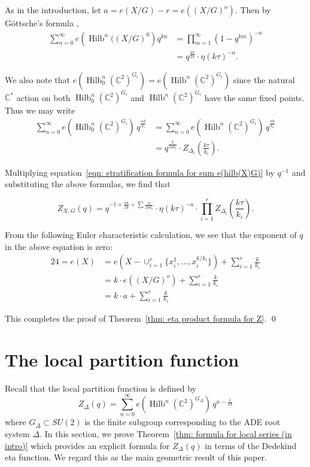 \documentclass{amsart}
\theoremstyle{definition}
\newcommand{\CC} {{\mathbb C}}          %
\newcommand{\Hilb}{\operatorname{Hilb}}
\begin{document}
As in the introduction, let $a = e(X/G)-r=e\left((X/G)^{o}
\right)$. Then by G\"ottsche's formula \cite{gottsche1990betti},
\begin{align*}
\sum_{n=0}^{\infty} e\left(\Hilb^{n}((X/G)^{0} \right) q^{kn} &=
\prod_{m=1}^{\infty} (1-q^{km})^{-a}\\
&= q^{\frac{ak}{24}} \cdot \eta (k\tau )^{-a}. 
\end{align*}

We also note that $e\left(\Hilb_{0}^{n}(\CC^{2})^{G_{i}}
\right)=e\left(\Hilb^{n}(\CC^{2})^{G_{i}} \right)$ since the natural
$\CC^{*}$ action on both $\Hilb_{0}^{n}(\CC^{2})^{G_{i}}$ and
$\Hilb^{n}(\CC^{2})^{G_{i}}$ have the same fixed points. Thus we may
write
\begin{align*}
\sum_{n=0}^{\infty} e\left(\Hilb_{0}^{n}(\CC^{2})^{G_{i}} \right) \,
q^{\frac{nk}{k_{i}}} &= \sum_{n=0}^{\infty} e\left(\Hilb^{n}(\CC^{2})^{G_{i}} \right) \,
q^{\frac{nk}{k_{i}}}\\
&= q^{\frac{k}{24k_{i}}} \cdot Z_{\Delta_{i}} \left(\frac{k\tau}{k_{i}}
\right) .
\end{align*}

Multiplying equation~\eqref{eqn: stratification formula for sum
e(hilb(X)G)} by $q^{-1}$ and substituting the above formulas, we find
that

\[
Z_{X,G}(q) = q^{-1 +\frac{ak}{24} + \sum \frac{k}{24k_{i}} } \cdot 
\eta (k\tau )^{-a}\cdot 
\prod_{i=1}^{r}Z_{\Delta_{i}}\left(\frac{k\tau}{k_{i}} \right) .
\]

From the following Euler characteristic calculation, we see that the exponent of $q$ in the above equation is zero:
\begin{align*}
24 = e(X) &= e\left(X-\cup_{i=1}^{r} \{x_{i}^{1},\dotsc
,x_{i}^{k/k_{i}} \} \right) + \sum_{i=1}^{r} \frac{k}{k_{i}} \\
&= k \cdot e\left((X/G)^{o} \right) + \sum_{i=1}^{r} \frac{k}{k_{i}} \\
&= k\cdot a + \sum_{i=1}^{r}\frac{k}{k_{i}} 
\end{align*}

This completes the proof of Theorem~\ref{thm: eta product formula for
Z}.  \qed


\section{The local partition function}\label{sec: proof of formula for local series}


Recall that the local partition function is defined by
\[
Z_{\Delta} (q) = \sum_{n=0}^{\infty}
e\left(\Hilb^{n}(\CC^{2})^{G_{\Delta}} \right) \, q^{n-\frac{1}{24}} 
\]
where $G_{\Delta}\subset SU(2)$ is the finite subgroup corresponding
to the ADE root system $\Delta$. In this section, we prove
Theorem~\ref{thm: formula for local series (in intro)} which provides
an explicit formula for $Z_{\Delta}(q)$ in terms of the Dedekind eta
function.  We regard this as the main geometric result of this paper. 
 
\end{document}
